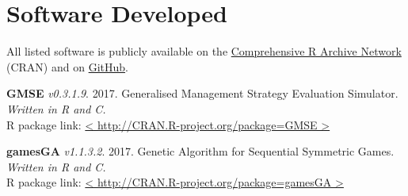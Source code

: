 \documentclass[letterpaper]{article}
\begin{document}
\section*{Software Developed}

All listed software is publicly available on the \href{https://cran.r-project.org/}{Comprehensive R Archive Network} (CRAN) and on \href{https://github.com/bradduthie}{GitHub}.

\begin{etaremune}
\item {\bf GMSE} {\it v0.3.1.9}. 2017. Generalised Management Strategy Evaluation Simulator. {\it Written in R and C.} \\
R package link: \href{http://CRAN.R-project.org/package=GMSE}{< http://CRAN.R-project.org/package=GMSE >}
\item {\bf gamesGA} {\it v1.1.3.2}. 2017. Genetic Algorithm for Sequential Symmetric Games. {\it Written in R and C.} \\
R package link: \href{http://CRAN.R-project.org/package=gamesGA}{< http://CRAN.R-project.org/package=gamesGA >}
\end{etaremune}
\end{document}
